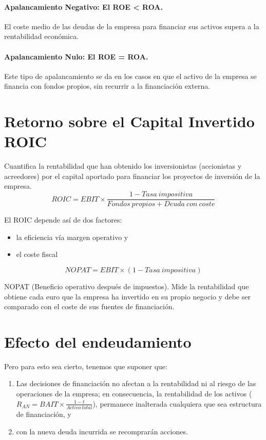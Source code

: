 \paragraph{Apalancamiento Negativo: El ROE < ROA.} El coste medio de las deudas de la empresa para financiar sus activos supera a la rentabilidad económica.

\paragraph{Apalancamiento Nulo: El ROE = ROA.} Este tipo de apalancamiento se da en los casos en que el activo de la empresa se financia con fondos propios, sin recurrir a la financiación externa.

\section*{Retorno sobre el Capital Invertido ROIC}
Cuantifica la rentabilidad que han obtenido los inversionistas (accionistas y acreedores) por el capital aportado para financiar los proyectos de inversión de la empresa.
\[ ROIC = EBIT \times \frac{1 - Tasa\ impositiva}{Fondos\ propios + Deuda\ con\ coste}\]

El ROIC depende así de dos factores:
\begin{itemize}
    \item la eficiencia vía margen operativo y
    \item el coste fiscal
\end{itemize}

\[NOPAT = EBIT \times (1 - Tasa\ impositiva)\]

NOPAT (Beneficio operativo después de impuestos). Mide la rentabilidad que obtiene cada euro que la empresa ha invertido en su propio negocio y debe ser comparado con el coste de sus fuentes de financiación.

\section*{Efecto del endeudamiento}
Pero para esto sea cierto, tenemos que suponer que:
\begin{enumerate}
    \item Las decisiones de financiación no afectan a la rentabilidad ni al riesgo de las operaciones de la empresa; en consecuencia, la rentabilidad de los activos ($R_{AN} = BAIT \times \frac{1 - t}{Activo\ total}$), permanece inalterada cualquiera que sea estructura de financiación, y
    \item con la nueva deuda incurrida se recomprarán acciones.
\end{enumerate}

